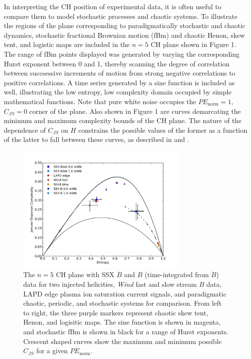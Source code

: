 \documentclass[aps,pre,twocolumn,secnumarabic,nobalancelastpage,amsmath,amssymb,
nofootinbib]{revtex4-1}
\begin{document}
In interpreting the CH position of experimental data, it is often useful to compare them to model  stochastic processes and chaotic systems. To illustrate the regions of the plane corresponding to paradigmatically stochastic and chaotic dynamics, stochastic fractional Brownian motion (fBm) and chaotic Henon, skew tent, and logistic maps are included in the $n=5$ CH plane shown in Figure 1. The range of fBm points displayed was generated by varying the corresponding Hurst exponent between 0 and 1, thereby scanning the degree of correlation between succsessive increments of motion from strong negative correlations to positive correlations. A time series generated by a sine function is included as well, illustrating the low entropy, low complexity domain occupied by simple mathematical functions. Note that pure white noise occupies the $PE_{\text{norm}}=1$, $C_{JS}=0$ corner of the plane. Also shown in Figure 1 are curves demarcating the minimum and maximum complexity bounds of the CH plane. The nature of the dependence of $C_{JS}$ on $H$ constrains the possible values of the former as a function of the latter to fall between these curves, as described in \cite{lopez1995} and \cite{calbet2001}.
\begin{figure}[!htbp]
\centerline{
\includegraphics[width=8.5cm]{fig1new.png}}
\caption{\label{fig:CHplane} The $n=5$ CH plane  with SSX $\dot{B}$ and $B$ (time-integrated from $\dot{B}$) data for two injected helicities, \textit{Wind} fast and slow stream $B$ data, LAPD edge plasma ion saturation current signals, and paradigmatic chaotic, periodic, and stochastic systems for comparison. From left to right, the three purple markers represent chaotic skew tent, Henon, and logisitic maps. The sine function is shown in magenta, and stochastic fBm is shown in black for a range of Hurst exponents. Crescent shaped curves show the maximum and minimum possible $C_{JS}$ for a given $PE_{\text{norm}}$.}
\end{figure}
\end{document}
